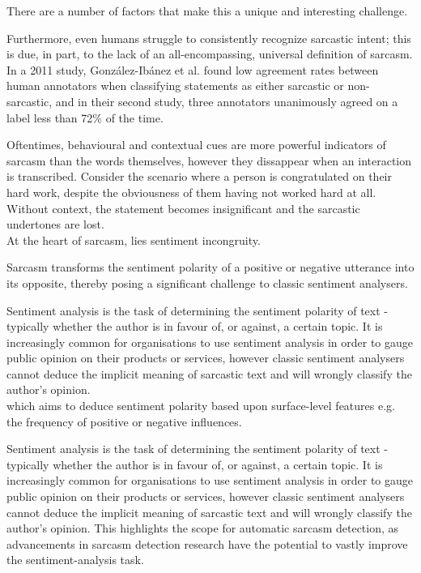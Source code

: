 \documentclass[12pt,a4paper]{article}
\begin{document}
\noindent There are a number of factors that make this a unique and interesting challenge. 

Furthermore, even humans struggle to consistently recognize sarcastic intent; this is due, in part, to the lack of an all-encompassing, universal definition of sarcasm. In a 2011 study, Gonz{\'a}lez-Ib{\'a}nez et al. \cite{gonzalez2011identifying} found low agreement rates between human annotators when classifying statements as either sarcastic or non-sarcastic, and in their second study, three annotators unanimously agreed on a label less than 72\% of the time. 




Oftentimes, behavioural and contextual cues are more powerful indicators of sarcasm than the words themselves, however they dissappear when an interaction is transcribed. Consider the scenario where a person is congratulated on their hard work, despite the obviousness of them having not worked hard at all. Without context, the statement becomes insignificant and the sarcastic undertones are lost.\\

At the heart of sarcasm, lies sentiment incongruity.




Sarcasm transforms the sentiment polarity of a positive or negative utterance into its opposite, thereby posing a significant challenge to classic sentiment analysers. 

Sentiment analysis is the task of determining the sentiment polarity of text - typically whether the author is in favour of, or against, a certain topic. It is increasingly common for organisations to use sentiment analysis in order to gauge public opinion on their products or services, however classic sentiment analysers cannot deduce the implicit meaning of sarcastic text and will wrongly classify the author's opinion. \\

 which aims to deduce sentiment polarity based upon surface-level features e.g. the frequency of positive or negative influences.


Sentiment analysis is the task of determining the sentiment polarity of text - typically whether the author is in favour of, or against, a certain topic. It is increasingly common for organisations to use sentiment analysis in order to gauge public opinion on their products or services, however classic sentiment analysers cannot deduce the implicit meaning of sarcastic text and will wrongly classify the author's opinion. This highlights the scope for automatic sarcasm detection, as advancements in sarcasm detection research have the potential to vastly improve the sentiment-analysis task.\\
\end{document}
